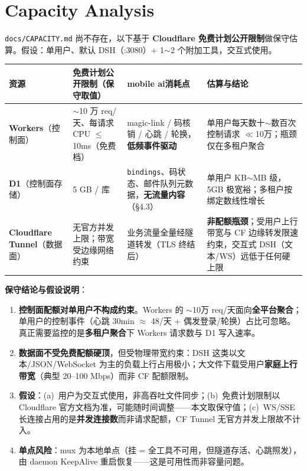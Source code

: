 \documentclass[10pt,a4paper]{article}
\newcommand{\sys}{mobile ai}
\begin{document}
\section{Capacity Analysis}

\noindent \texttt{docs/CAPACITY.md} 尚不存在，以下基于 \textbf{Cloudflare 免费计划公开限制}做保守估算。假设：单用户、默认 DSH（:3080）+ 1$\sim$2 个附加工具，交互式使用。

\begin{longtable}{@{}p{2.5cm}p{3.7cm}p{4.0cm}p{4.6cm}@{}}
\toprule
资源 & 免费计划公开限制（保守取值） & \sys 消耗点 & 估算与结论\\
\midrule
\textbf{Workers}（控制面） & $\sim$10 万 req/天、每请求 CPU $\leq$10ms（免费档） & magic-link / 码核销 / 心跳 / 轮换，\textbf{低频事件驱动} & 单用户每天数十$\sim$数百次控制请求 $\ll$10万；瓶颈仅在多租户聚合\\
\addlinespace[2pt]
\textbf{D1}（控制面存储） & 5 GB / 库 & \texttt{bindings}、码状态、邮件队列元数据，\textbf{无流量内容}（§4.3） & 单用户 KB$\sim$MB 级，5GB 极宽裕；多租户按绑定数线性增长\\
\addlinespace[2pt]
\textbf{Cloudflare Tunnel}（数据面） & 无官方并发上限；带宽受边缘网络约束 & 业务流量全量经隧道转发（TLS 终结后） & \textbf{非配额瓶颈}；受用户上行带宽与 CF 边缘转发限速约束，交互式 DSH（文本/WS）远低于任何硬上限\\
\bottomrule
\end{longtable}

\noindent\textbf{保守结论与假设说明}：
\begin{enumerate}[leftmargin=1.6em,itemsep=0.25em,topsep=0.3em]
  \item \textbf{控制面配额对单用户不构成约束}。Workers 的 $\sim$10万 req/天面向\textbf{全平台聚合}；单用户的控制事件（心跳 30min $\approx$ 48/天 + 偶发登录/轮换）占比可忽略。真正需要监控的是\textbf{多租户聚合}下 Workers 请求数与 D1 写入速率。
  \item \textbf{数据面不受免费配额硬顶}，但受物理带宽约束：DSH 这类以文本/JSON/WebSocket 为主的负载上行占用极小；大文件下载受用户\textbf{家庭上行带宽}（典型 20--100 Mbps）而非 CF 配额限制。
  \item \textbf{假设}：(a)~用户为交互式使用，非高吞吐文件同步；(b)~免费计划限制以 Cloudflare 官方文档为准，可能随时间调整——本文取保守值；(c)~WS/SSE 长连接占用的是\textbf{并发连接数}而非请求配额，CF Tunnel 无官方并发上限故不计入。
  \item \textbf{单点风险}：mux 为本地单点（挂 = 全工具不可用，但隧道存活、心跳照发），由 daemon KeepAlive 重启恢复——这是可用性而非容量问题。
\end{enumerate}
\end{document}
